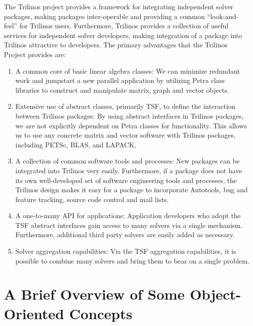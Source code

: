 \documentclass[12pt,relax]{TrilinosOverview}
\begin{document}
The Trilinos project provides a framework for integrating independent 
solver packages, making packages inter-operable and providing a 
common ``look-and-feel'' 
for Trilinos users.  Furthermore, Trilinos provides a collection 
of useful services for
independent solver developers, making integration of a package into 
Trilinos 
attractive to developers.
The primary advantages that the Trilinos Project provides are:
\begin{enumerate}
\item A common core of basic linear algebra classes:
We can minimize redundant work and jumpstart a new parallel application
by utilizing Petra class libraries to construct 
and manipulate matrix, graph and vector objects.
\item Extensive use of abstract classes, primarily TSF, to define the 
interaction between Trilinos
packages:  By using abstract interfaces in Trilinos packages, we are
not explicitly dependent on Petra classes for functionality.  
This allows us to use any
concrete matrix and vector software with Trilinos packages, 
including PETSc, BLAS, 
and LAPACK.
\item A collection of common software tools and processes: New packages can be 
integrated into Trilinos very easily.  Furthermore, if a package 
does not have its own well-developed set of software engineering tools
and processes, the Trilinos design makes it easy for a package to 
incorporate Autotools, bug and feature tracking,
source code control and mail lists.
\item A one-to-many API for applications: Application developers who 
adopt the TSF abstract interfaces gain access to many solvers via a 
single mechanism.  Furthermore, additional third
party solvers are easily added as necessary.
\item Solver aggregation capabilities:  Via the TSF aggregation 
capabilities, it is possible
to combine many solvers and bring them to bear on a single problem.
\end{enumerate}

\clearpage

%



\appendix
\section{A Brief Overview of Some Object-Oriented Concepts}
\label{sect:OOTutorial}
\end{document}
